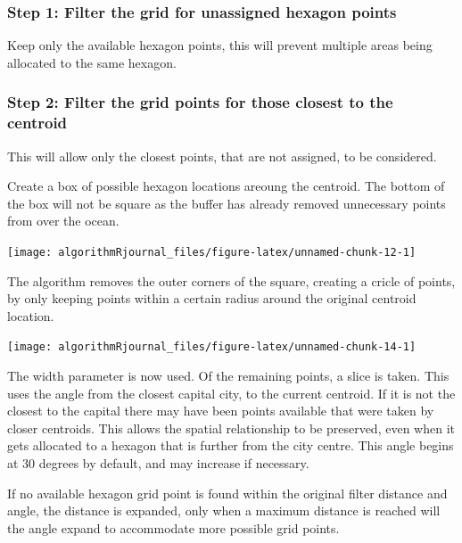 \hypertarget{step-1-filter-the-grid-for-unassigned-hexagon-points}{%
\subsubsection{Step 1: Filter the grid for unassigned hexagon
points}\label{step-1-filter-the-grid-for-unassigned-hexagon-points}}

Keep only the available hexagon points, this will prevent multiple areas
being allocated to the same hexagon.

\hypertarget{step-2-filter-the-grid-points-for-those-closest-to-the-centroid}{%
\subsubsection{Step 2: Filter the grid points for those closest to the
centroid}\label{step-2-filter-the-grid-points-for-those-closest-to-the-centroid}}

This will allow only the closest points, that are not assigned, to be
considered.

Create a box of possible hexagon locations areoung the centroid. The
bottom of the box will not be square as the buffer has already removed
unnecessary points from over the ocean.

\begin{Schunk}

\texttt{[image: algorithmRjournal\_files/figure-latex/unnamed-chunk-12-1]} \end{Schunk}

The algorithm removes the outer corners of the square, creating a cricle
of points, by only keeping points within a certain radius around the
original centroid location.

\begin{Schunk}

\texttt{[image: algorithmRjournal\_files/figure-latex/unnamed-chunk-14-1]} \end{Schunk}

The width parameter is now used. Of the remaining points, a slice is
taken. This uses the angle from the closest capital city, to the current
centroid. If it is not the closest to the capital there may have been
points available that were taken by closer centroids. This allows the
spatial relationship to be preserved, even when it gets allocated to a
hexagon that is further from the city centre. This angle begins at 30
degrees by default, and may increase if necessary.

If no available hexagon grid point is found within the original filter
distance and angle, the distance is expanded, only when a maximum
distance is reached will the angle expand to accommodate more possible
grid points.

